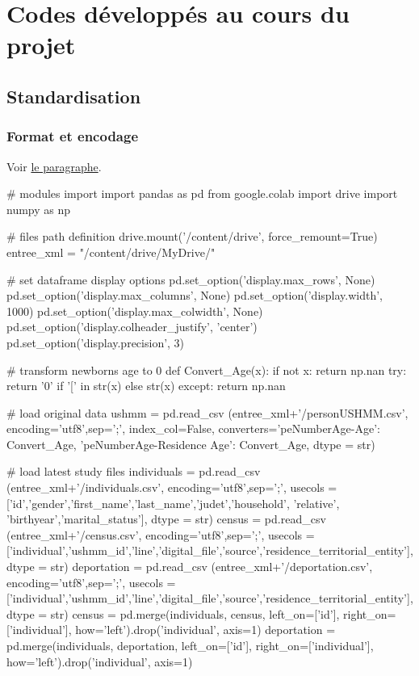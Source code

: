 \documentclass[a4paper,12pt,twoside]{book}
\begin{document}
	\chapter{Codes développés au cours du projet}
		\label{codes}
		
		\section{Standardisation}
	        
	        \subsection{Format et encodage}
    	        Voir \hyperref[encod]{le paragraphe}.
    		    \label{format_code}
    		    \begin{python}
# modules import    		    
import pandas as pd
from google.colab import drive
import numpy as np

# files path definition
drive.mount('/content/drive', force_remount=True)
entree_xml = "/content/drive/MyDrive/"

# set dataframe display options
pd.set_option('display.max_rows', None)
pd.set_option('display.max_columns', None)
pd.set_option('display.width', 1000)
pd.set_option('display.max_colwidth', None)
pd.set_option('display.colheader_justify', 'center')
pd.set_option('display.precision', 3)

# transform newborns age to 0
def Convert_Age(x):
  if not x:
    return np.nan
  try:
    return '0' if '[' in str(x) else str(x)   
  except:        
    return np.nan

# load original data
ushmm = pd.read_csv (entree_xml+'/personUSHMM.csv', encoding='utf8',sep=';', index_col=False, converters={'peNumberAge-Age': Convert_Age, 'peNumberAge-Residence Age': Convert_Age}, dtype = str)

# load latest study files
individuals = pd.read_csv (entree_xml+'/individuals.csv', encoding='utf8',sep=';', usecols = ['id','gender','first_name','last_name','judet','household', 'relative', 'birthyear','marital_status'],  dtype = str)
census = pd.read_csv (entree_xml+'/census.csv', encoding='utf8',sep=';', usecols = ['individual','ushmm_id','line','digital_file','source','residence_territorial_entity'],  dtype = str)
deportation = pd.read_csv (entree_xml+'/deportation.csv', encoding='utf8',sep=';', usecols = ['individual','ushmm_id','line','digital_file','source','residence_territorial_entity'], dtype = str)
census = pd.merge(individuals, census, left_on=['id'], right_on=['individual'], how='left').drop('individual', axis=1)
deportation = pd.merge(individuals, deportation, left_on=['id'], right_on=['individual'], how='left').drop('individual', axis=1)


\end{python}
\end{document}
